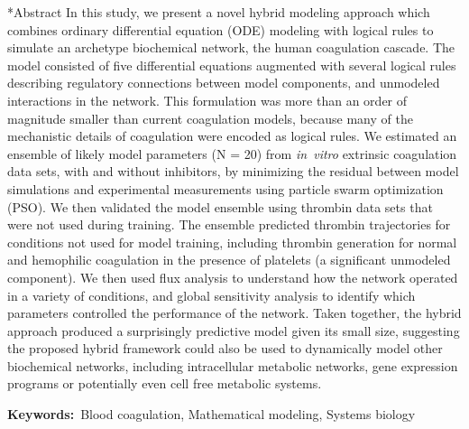 \documentclass[12pt]{article}
\makeatletter
\renewcommand\section{\@startsection
	{subsection}{2}{0mm}
	{-0.2in}
	{0.05\baselineskip}
	{\normalfont\large\bfseries}}
\makeatother
\begin{document}
\section*{Abstract}
In this study, we present a novel hybrid modeling approach which combines ordinary differential equation (ODE) modeling with logical rules to simulate an archetype biochemical network, 
the human coagulation cascade.  
The model consisted of five differential equations augmented with several logical rules describing 
regulatory connections between model components, and unmodeled interactions in the network. 
This formulation was more than an order of magnitude smaller than current coagulation models, 
because many of the mechanistic details of coagulation were encoded as logical rules.
We estimated an ensemble of likely model parameters (N = 20) from \textit{in~vitro} extrinsic coagulation data sets, with and without inhibitors, 
by minimizing the residual between model simulations and experimental measurements using particle swarm optimization (PSO). 
We then validated the model ensemble using thrombin data sets that were not used during training. 
The ensemble predicted thrombin trajectories for conditions not used for model training, including thrombin generation for normal and hemophilic coagulation 
in the presence of platelets (a significant unmodeled component).
We then used flux analysis to understand how the network operated in a variety of conditions, and global sensitivity analysis to identify which parameters controlled the 
performance of the network. Taken together, the hybrid approach produced a surprisingly predictive model given its small size, 
suggesting the proposed hybrid framework could also be used to dynamically model other biochemical networks, including intracellular metabolic networks, gene expression programs 
or potentially even cell free metabolic systems. 

\vspace{0.25in}
{\noindent \textbf{Keywords:}~Blood coagulation, Mathematical modeling, Systems biology}

\pagebreak

\setcounter{page}{1}

\linenumbers

%
\end{document}
